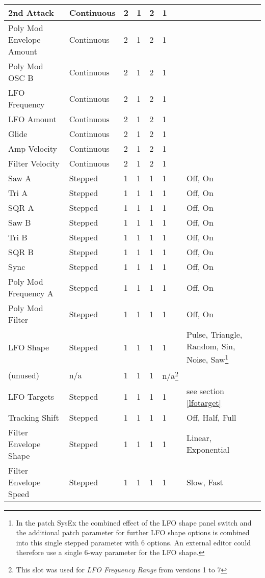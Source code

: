 \begin{longtable}[l]{p{5cm}|p{2cm}|p{1.5cm}|p{1.5cm}|p{2cm}|p{2.2cm}|p{5cm}}
2nd Attack & Continuous & 2 & 1 & 2 & 1 &  \\ \hline
Poly Mod Envelope Amount & Continuous & 2 & 1 & 2 & 1 &  \\ \hline
Poly Mod OSC B & Continuous & 2 & 1 & 2 & 1 &  \\ \hline
LFO Frequency & Continuous & 2 & 1 & 2 & 1 &  \\ \hline
LFO Amount & Continuous & 2 & 1 & 2 & 1 &  \\ \hline
Glide & Continuous & 2 & 1 & 2 & 1 &  \\ \hline
Amp Velocity & Continuous & 2 & 1 & 2 & 1 &  \\ \hline
Filter Velocity & Continuous & 2 & 1 & 2 & 1 &  \\ \hline
Saw A & Stepped & 1 & 1 & 1 & 1 & Off, On \\ \hline
Tri A & Stepped & 1 & 1 & 1 & 1 & Off, On \\ \hline
SQR A & Stepped & 1 & 1 & 1 & 1 & Off, On \\ \hline
Saw B & Stepped & 1 & 1 & 1 & 1 & Off, On \\ \hline
Tri B & Stepped & 1 & 1 & 1 & 1 & Off, On \\ \hline
SQR B & Stepped & 1 & 1 & 1 & 1 & Off, On \\ \hline
Sync & Stepped & 1 & 1 & 1 & 1 & Off, On \\ \hline
Poly Mod Frequency A & Stepped & 1 & 1 & 1 & 1 & Off, On \\ \hline
Poly Mod Filter & Stepped & 1 & 1 & 1 & 1 & Off, On \\ \hline
LFO Shape & Stepped & 1 & 1 & 1 & 1 & Pulse, Triangle, Random, Sin, Noise, Saw\footnote{In the patch SysEx the combined effect of the LFO shape panel switch and the additional patch parameter for further LFO shape options is combined into this single stepped parameter with 6 options. An external editor could therefore use a single 6-way parameter for the LFO shape.} \\ \hline
(unused) & n/a & 1 & 1 & 1 & n/a\footnote{This slot was used for \textit{LFO Frequency Range} from versions 1 to 7} &  \\ \hline
LFO Targets & Stepped & 1 & 1 & 1 & 1 & see section \ref{lfotarget}  \\ \hline
Tracking Shift & Stepped & 1 & 1 & 1 & 1 & Off, Half, Full \\ \hline
Filter Envelope Shape & Stepped & 1 & 1 & 1 & 1 & Linear, Exponential \\ \hline
Filter Envelope Speed & Stepped & 1 & 1 & 1 & 1 & Slow, Fast \\ \hline

\end{longtable}
